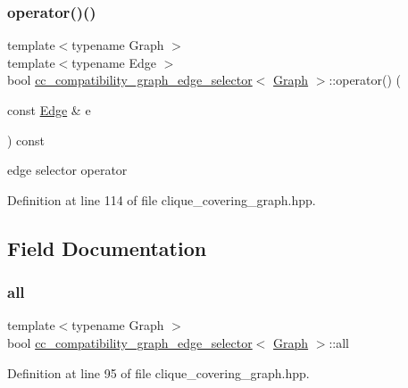 \subsubsection{\texorpdfstring{operator()()}{operator()()}}
{\footnotesize\ttfamily template$<$typename Graph $>$ \\
template$<$typename Edge $>$ \\
bool \hyperlink{structcc__compatibility__graph__edge__selector}{cc\+\_\+compatibility\+\_\+graph\+\_\+edge\+\_\+selector}$<$ \hyperlink{structGraph}{Graph} $>$\+::operator() (\begin{DoxyParamCaption}\item[{const \hyperlink{structEdge}{Edge} \&}]{e }\end{DoxyParamCaption}) const\hspace{0.3cm}{\ttfamily [inline]}}



edge selector operator 



Definition at line 114 of file clique\+\_\+covering\+\_\+graph.\+hpp.



\subsection{Field Documentation}
\mbox{\label{structcc__compatibility__graph__edge__selector_a33232f3588d2f8aef8fd538901d694f2}} 
\subsubsection{\texorpdfstring{all}{all}}
{\footnotesize\ttfamily template$<$typename Graph $>$ \\
bool \hyperlink{structcc__compatibility__graph__edge__selector}{cc\+\_\+compatibility\+\_\+graph\+\_\+edge\+\_\+selector}$<$ \hyperlink{structGraph}{Graph} $>$\+::all\hspace{0.3cm}{\ttfamily [private]}}



Definition at line 95 of file clique\+\_\+covering\+\_\+graph.\+hpp.

\mbox{\label{structcc__compatibility__graph__edge__selector_a763eb0a750fc3472fd179fb371de50e0}} 
